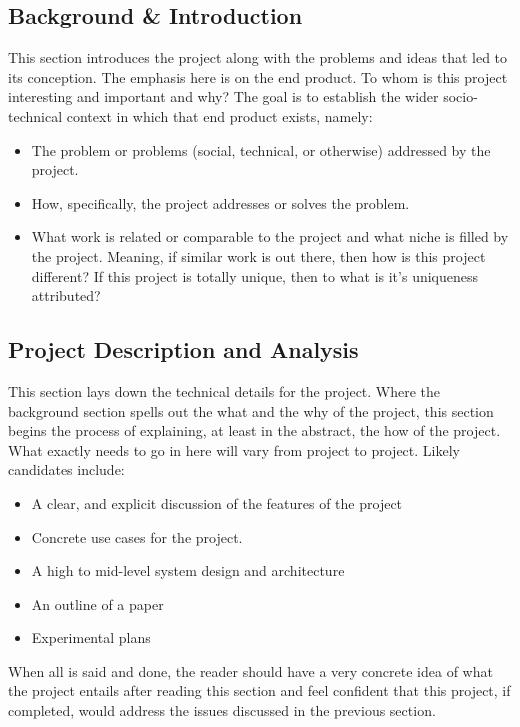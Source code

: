 \documentclass[nobib]{tufte-handout}
\begin{document}
\subsection{Background \& Introduction}

This section introduces the project along with the problems and ideas that led to its conception.  The emphasis here is on the end product.  To whom is this project interesting and important and why? The goal is to establish the wider socio-technical context in which that end product exists, namely:
\begin{itemize}
\item The problem or problems (social, technical, or otherwise) addressed by the project.
\item How, specifically, the project addresses or solves the problem.
\item What work is related or comparable to the project and what niche is filled by the project. Meaning, if similar work is out there, then how is this project different?  If this project is totally unique, then to what is it's uniqueness attributed?
\end{itemize}


\subsection{Project Description and Analysis}


This section lays down the technical details for the project. Where the background section spells out the what and the why of the project, this section begins the process of explaining, at least in the abstract, the how of the project. What exactly needs to go in here will vary from project to project.  Likely candidates include:
\begin{itemize}
\item A clear, and explicit discussion of the features of the project
\item Concrete use cases for the project.
\item A high to mid-level system design and architecture
\item An outline of a paper
\item Experimental plans
\end{itemize}
When all is said and done, the reader should have a very concrete idea of what the project entails after reading this section and feel confident that this project, if completed, would address the issues discussed in the previous section.
\end{document}
